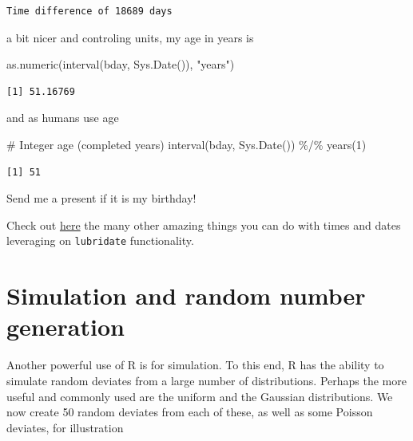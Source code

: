 \documentclass[
  letterpaper,
  DIV=11,
  numbers=noendperiod]{scrartcl}
\newenvironment{Shaded}{\begin{snugshade}}{\end{snugshade}}
\newcommand{\CommentTok}[1]{\textcolor[rgb]{0.37,0.37,0.37}{#1}}
\newcommand{\DecValTok}[1]{\textcolor[rgb]{0.68,0.00,0.00}{#1}}
\newcommand{\FunctionTok}[1]{\textcolor[rgb]{0.28,0.35,0.67}{#1}}
\newcommand{\NormalTok}[1]{\textcolor[rgb]{0.00,0.23,0.31}{#1}}
\newcommand{\SpecialCharTok}[1]{\textcolor[rgb]{0.37,0.37,0.37}{#1}}
\newcommand{\StringTok}[1]{\textcolor[rgb]{0.13,0.47,0.30}{#1}}
\begin{document}
\begin{verbatim}
Time difference of 18689 days
\end{verbatim}

a bit nicer and controling units, my age in years is

\begin{Shaded}
\begin{Highlighting}[]
\FunctionTok{as.numeric}\NormalTok{(}\FunctionTok{interval}\NormalTok{(bday, }\FunctionTok{Sys.Date}\NormalTok{()), }\StringTok{"years"}\NormalTok{)}
\end{Highlighting}
\end{Shaded}

\begin{verbatim}
[1] 51.16769
\end{verbatim}

and as humans use age

\begin{Shaded}
\begin{Highlighting}[]
\CommentTok{\# Integer age (completed years)}
\FunctionTok{interval}\NormalTok{(bday, }\FunctionTok{Sys.Date}\NormalTok{()) }\SpecialCharTok{\%/\%} \FunctionTok{years}\NormalTok{(}\DecValTok{1}\NormalTok{)}
\end{Highlighting}
\end{Shaded}

\begin{verbatim}
[1] 51
\end{verbatim}

Send me a present if it is my birthday!

Check out
\href{https://rstudio.github.io/cheatsheets/html/lubridate.html}{here}
the many other amazing things you can do with times and dates leveraging
on \texttt{lubridate} functionality.

\section{Simulation and random number
generation}\label{simulation-and-random-number-generation}

Another powerful use of R is for simulation. To this end, R has the
ability to simulate random deviates from a large number of
distributions. Perhaps the more useful and commonly used are the uniform
and the Gaussian distributions. We now create 50 random deviates from
each of these, as well as some Poisson deviates, for illustration
\end{document}
